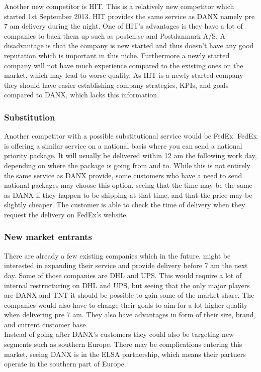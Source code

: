 Another new competitor is HIT. This is a relatively new competitor which started 1st September 2013. HIT provides the same service as DANX namely pre 7 am delivery during the night. 
One of HIT’s advantages is they have a lot of companies to back them up such as posten.se and Postdanmark A/S. A disadvantage is that the company is new started and thus doesn’t have any good reputation which is important in this niche. Furthermore a newly started company will not have much experience compared to the existing ones on the market, which may lead to worse quality.
As HIT is a newly started company they should have easier establishing company strategies, KPIs, and goals compared to DANX, which lacks this information.  

\subsubsection{Substitution}
Another competitor with a possible substitutional service would be FedEx. FedEx is offering a similar service on a national basis where you can send a national priority package. It will usually be delivered within 12 am the following work day, depending on where the package is going from and to. While this is not entirely the same service as DANX provide, some customers who have a need to send national packages may choose this option, seeing that the time may be the same as DANX if they happen to be shipping at that time, and that the price may be slightly cheaper. The customer is able to check the time of delivery when they request the delivery on FedEx’s website. \\

\subsubsection{New market entrants}
There are already a few existing companies which in the future, might be interested in expanding their service and provide delivery before 7 am the next day. Some of those companies are DHL and UPS.
This would require a lot of internal restructuring on DHL and UPS, but seeing that the only major players are DANX and TNT it should be possible to gain some of the market share. The companies would also have to change their goals to aim for a lot higher quality when delivering pre 7 am. They also have advantages in form of their size, brand, and current customer base.\\

Instead of going after DANX’s customers they could also be targeting new segments such as southern Europe. There may be complications entering this market, seeing DANX is in the ELSA partnership, which means their partners operate in the southern part of Europe.


